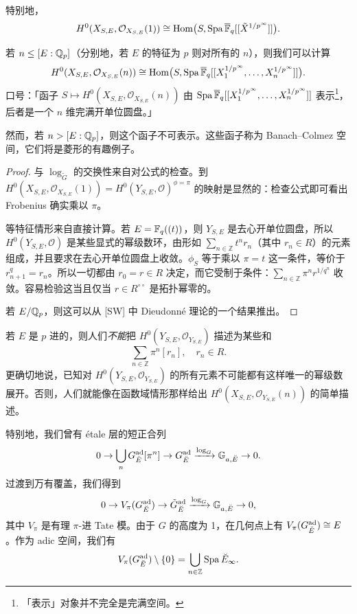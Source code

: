 
特别地，
\[
  H^0(X_{S,E},\mathcal O_{X_{S,E}}(1)) \cong \operatorname{Hom}\bigl(S,\operatorname{Spa} \overline{\mathbb{F}}_q[[\tilde X^{1/p^\infty}]]\bigr).
\]

\begin{remark}
若 $n \le [E:\mathbb{Q}_p]$（分别地，若 $E$ 的特征为 $p$ 则对所有的 $n$），则我们可以计算
\[
  H^0(X_{S,E},\mathcal O_{X_{S,E}}(n)) \cong \operatorname{Hom}\bigl(S,\operatorname{Spa} \overline{\mathbb{F}}_q[[X_1^{1/p^\infty},\dots,X_n^{1/p^\infty}]]\bigr).
\]
口号：「函子 $S \mapsto H^0(X_{S,E},\mathcal O_{X_{S,E}}(n))$ 由 $\operatorname{Spa} \overline{\mathbb{F}}_q[[X_1^{1/p^\infty},\dots,X_n^{1/p^\infty}]]$ 表示\footnote{「表示」对象并不完全是完满空间。}，后者是一个 $n$ 维完满开单位圆盘。」

然而，若 $n > [E:\mathbb{Q}_p]$，则这个函子不可表示。这些函子称为 Banach–Colmez 空间，它们将是菱形的有趣例子。
\end{remark}

\begin{proof}
与 $\log_{\tilde G}$ 的交换性来自对公式的检查。到 $H^0(X_{S,E},\mathcal O_{X_{S,E}}(1)) = H^0(Y_{S,E},\mathcal O)^{\phi=\pi}$ 的映射是显然的：检查公式即可看出 Frobenius 确实乘以 $\pi$。

等特征情形来自直接计算。若 $E = \mathbb{F}_q((t))$，则 $Y_{S,E}$ 是去心开单位圆盘，所以 $H^0(Y_{S,E},\mathcal O)$ 是某些显式的幂级数环，由形如 $\sum_{n\in\mathbb Z} t^n r_n$（其中 $r_n \in R$）的元素组成，并且要求在去心开单位圆盘上收敛。$\phi_S$ 等于乘以 $\pi = t$ 这一条件，等价于 $r_{n+1}^q = r_n$。所以一切都由 $r_0 = r \in R$ 决定，而它受制于条件：$\sum_{n\in\mathbb Z}\pi^n r^{1/q^n}$ 收敛。容易检验这当且仅当 $r \in R^{\circ\circ}$ 是拓扑幂零的。

若 $E/\mathbb{Q}_p$，则这可以从 [SW] 中 Dieudonné 理论的一个结果推出。
\end{proof}

\begin{warning}
若 $E$ 是 $p$ 进的，则人们\emph{不能}把 $H^0(Y_{S,E},\mathcal O_{Y_{S,E}})$ 描述为某些和
\[
  \sum_{n\in\mathbb Z} \pi^n[r_n], \quad r_n \in R.
\]
更确切地说，已知对 $H^0(Y_{S,E},\mathcal O_{Y_{S,E}})$ 的所有元素不可能都有这样唯一的幂级数展开。否则，人们就能像在函数域情形那样给出 $H^0(X_{S,E},\mathcal O_{Y_{S,E}}(n))$ 的简单描述。
\end{warning}

特别地，我们曾有 étale 层的短正合列
\[
  0 \to \bigcup_n G^{\mathrm{ad}}_{\breve{E}}[\pi^n] \to G^{\mathrm{ad}}_{\breve{E}} \xrightarrow{\log_G} \mathbb G_{a,\breve{E}} \to 0.
\]
过渡到万有覆盖，我们得到
\[
  0 \to V_\pi(G^{\mathrm{ad}}_{\breve{E}}) \to \tilde G^{\mathrm{ad}}_{\breve{E}} \xrightarrow{\log_G} \mathbb G_{a,\breve{E}} \to 0,
\]
其中 $V_\pi$ 是有理 $\pi$-进 Tate 模。由于 $G$ 的高度为 1，在几何点上有 $V_\pi(G^{\mathrm{ad}}_{\breve{E}}) \cong E$。作为 adic 空间，我们有
\[
  V_\pi(G^{\mathrm{ad}}_{\breve{E}}) \setminus \{0\} = \bigcup_{n \in \mathbb Z} \operatorname{Spa} \breve{E}_\infty .
\]

